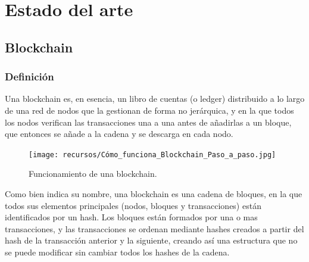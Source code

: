 \chapter{Estado del arte}
\section{Blockchain}
\subsection{Definición}
Una blockchain \cite{blockchain-simple} es, en esencia, un libro de cuentas (o ledger) distribuido a lo largo de una red de nodos que la gestionan de forma no jerárquica, y en la que todos los nodos verifican las transacciones una a una antes de añadirlas a un bloque, que entonces se añade a la cadena y se descarga en cada nodo.
\begin{figure}[h]
\centerline{\texttt{[image: recursos/Cómo\_funciona\_Blockchain\_Paso\_a\_paso.jpg]}}
\caption{Funcionamiento de una blockchain.}
\label{blockchain-funcionamiento}
\end{figure}

Como bien indica su nombre, una blockchain es una cadena de bloques, en la que todos sus elementos principales (nodos, bloques y transacciones) están identificados por un hash. Los bloques están formados por una o mas transacciones, y las transacciones se ordenan mediante hashes creados a partir del hash de la transacción anterior y la siguiente, creando así una estructura que no se puede modificar sin cambiar todos los hashes de la cadena.
